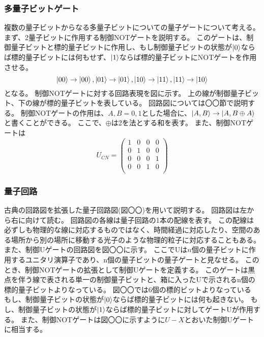 \subsubsection{多量子ビットゲート}
複数の量子ビットからなる多量子ビットについての量子ゲートについて考える。
まず、2量子ビットに作用する制御NOTゲートを説明する。
このゲートは、制御量子ビットと標的量子ビットに作用し、もし制御量子ビットの状態が$\ket{0}$ならば標的量子ビットには何もせず、$\ket{1}$ならば標的量子ビットにNOTゲートを作用させる。
\begin{equation}
    \ket{00} \rightarrow \ket{00}, 
    \ket{01} \rightarrow \ket{01},
    \ket{10} \rightarrow \ket{11},
    \ket{11} \rightarrow \ket{10}
\end{equation}
となる。
制御NOTゲートに対する回路表現を図に示す。
上の線が制御量子ビット、下の線が標的量子ビットを表している。
回路図については〇〇節で説明する。
制御NOTゲートの作用は、$A, B = 0, 1$とした場合に、$\ket{A, B} \rightarrow \ket{A, B \oplus A}$と書くことができる。
ここで、$\oplus$は2を法とする和を表す。
また、制御NOTゲートは
\begin{equation}
    U_{CN} = \begin{pmatrix}
        1 & 0 & 0 & 0 \\
        0 & 1 & 0 & 0 \\
        0 & 0 & 0 & 1 \\
        0 & 0 & 1 & 0 \\
    \end{pmatrix}
\end{equation}

\subsubsection{量子回路}
古典の回路図を拡張した量子回路図(図〇〇)を用いて説明する。
回路図は左から右に向けて読む。
回路図の各線は量子回路の1本の配線を表す。
この配線は必ずしも物理的な線に対応するものではなく、時間経過に対応したり、空間のある場所から別の場所に移動する光子のような物理的粒子に対応することもある。
また、制御Uゲートの回路図を図〇〇に示す。
ここでUは$n$個の量子ビットに作用するユニタリ演算子であり、n個の量子ビットの量子ゲートと見なせる。
このとき、制御NOTゲートの拡張として制御Uゲートを定義する。
このゲートは黒点を伴う線で表される単一の制御量子ビットと、箱に入ったUで示されるn個の標的量子ビットよりなっている。
図〇〇では6個の標的ビットよりなっている
もし、制御量子ビットの状態が$\ket{0}$ならば標的量子ビットには何も起きない。
もし、制御量子ビットの状態が$\ket{1}$ならば標的量子ビットに対してゲートUが作用する。
また、制御NOTゲートは図〇〇に示すように$U-X$とおいた制御Uゲートに相当する。